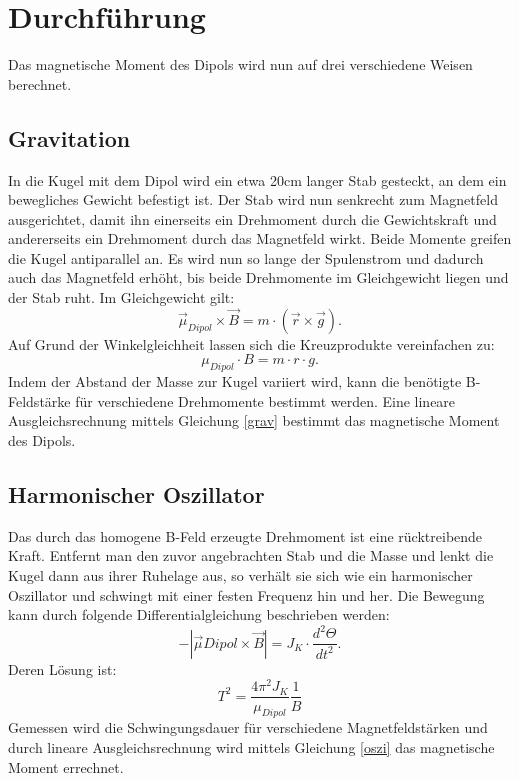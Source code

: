 \section{Durchführung}
Das magnetische Moment des Dipols wird nun auf drei verschiedene Weisen berechnet.


\subsection{Gravitation}
In die Kugel mit dem Dipol wird ein etwa 20cm langer Stab gesteckt, an dem ein bewegliches Gewicht befestigt ist. Der Stab wird nun senkrecht zum Magnetfeld ausgerichtet, damit ihn einerseits ein Drehmoment durch die Gewichtskraft und andererseits ein Drehmoment durch das Magnetfeld wirkt. Beide Momente greifen die Kugel antiparallel an. Es wird nun so lange der Spulenstrom und dadurch auch das Magnetfeld erhöht, bis beide Drehmomente im Gleichgewicht liegen und der Stab ruht.
Im Gleichgewicht gilt:
\begin{equation}
\vec{\mu}_{Dipol} \times \vec{B} = m\cdot (\vec{r} \times \vec{g} ).
\end{equation}
Auf Grund der Winkelgleichheit lassen sich die Kreuzprodukte vereinfachen zu:
\begin{equation}
\mu_{Dipol} \cdot B = m\cdot r \cdot g.
\label{grav}
\end{equation}
Indem der Abstand der Masse zur Kugel variiert wird, kann die benötigte B-Feldstärke für verschiedene Drehmomente bestimmt werden. Eine lineare Ausgleichsrechnung mittels Gleichung \eqref{grav} bestimmt das magnetische Moment des Dipols.
\subsection{Harmonischer Oszillator}
Das durch das homogene B-Feld erzeugte Drehmoment ist eine rücktreibende Kraft. Entfernt man den zuvor angebrachten Stab und die Masse und lenkt die Kugel dann aus ihrer Ruhelage aus, so verhält sie sich wie ein harmonischer Oszillator und schwingt mit einer festen Frequenz hin und her.
Die Bewegung kann durch folgende Differentialgleichung beschrieben werden:
\begin{equation}
-|\vec{\mu}Dipol \times \vec{B}| = J_K \cdot \frac{d^2 \Theta}{dt^2}.
\end{equation}
Deren Lösung ist:
\begin{equation}
T^2=\frac{4\pi^2J_K}{\mu_{Dipol}} \frac{1}{B}
\label{oszi}
\end{equation}
Gemessen wird die Schwingungsdauer für verschiedene Magnetfeldstärken und durch lineare Ausgleichsrechnung wird mittels Gleichung \eqref{oszi} das magnetische Moment errechnet.
